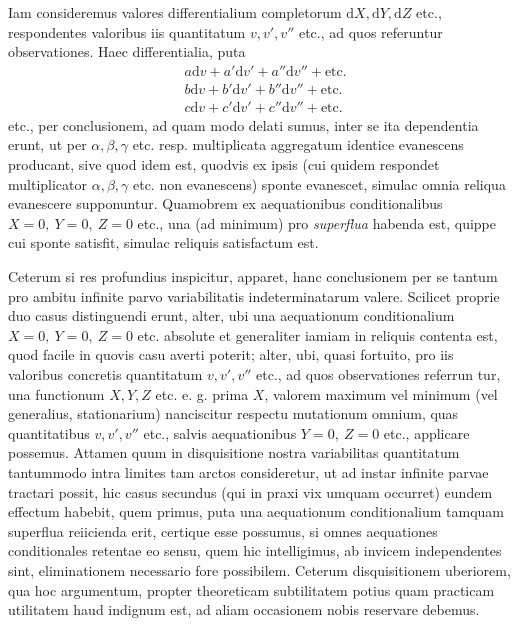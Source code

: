 Iam consideremus valores differentialium completorum \(\mathrm dX,\mathrm dY,\mathrm dZ\) etc., respondentes valoribus iis quantitatum \(v,v',v''\) etc., ad quos referuntur observationes. Haec differentialia, puta
\[
\begin{aligned}
&a\mathrm dv+a'\mathrm dv'+a''\mathrm dv''+\text{etc.}\\
&b\mathrm dv+b'\mathrm dv'+b''\mathrm dv''+\text{etc.}\\
&c\mathrm dv+c'\mathrm dv'+c''\mathrm dv''+\text{etc.}
\end{aligned}
\]
etc., per conclusionem, ad quam modo delati sumus, inter se ita dependentia erunt, ut per \(\alpha,\beta,\gamma\) etc. resp. multiplicata aggregatum identice evanescens producant, sive quod idem est, quodvis ex ipsis (cui quidem respondet multiplicator \(\alpha,\beta,\gamma\) etc. non evanescens) sponte evanescet, simulac omnia reliqua evanescere supponuntur. Quamobrem ex aequationibus conditionalibus \(X=0,\ Y=0,\ Z=0\) etc., una (ad minimum) pro \textit{superflua} habenda est, quippe cui sponte satisfit, simulac reliquis satisfactum est.

Ceterum si res profundius inspicitur, apparet, hanc conclusionem per se tantum pro ambitu infinite parvo variabilitatis indeterminatarum valere. Scilicet proprie duo casus distinguendi erunt, alter, ubi una aequationum conditionalium \(X=0,\ Y=0,\ Z=0\) etc. absolute et generaliter iamiam in reliquis contenta est, quod facile in quovis casu averti poterit; alter, ubi, quasi fortuito, pro iis valoribus concretis quantitatum \(v,v',v''\) etc., ad quos observationes referrun%
tur, una functionum \(X,Y,Z\) etc. e. g. prima \(X\), valorem maximum vel minimum (vel generalius, stationarium) nanciscitur respectu mutationum omnium, quas quantitatibus \(v,v',v''\) etc., salvis aequationibus \(Y=0,\ Z=0\) etc., applicare possemus. Attamen quum in disquisitione nostra variabilitas quantitatum tantummodo intra limites tam arctos consideretur, ut ad instar infinite parvae tractari possit, hic casus secundus (qui in praxi vix umquam occurret) eundem effectum habebit, quem primus, puta una aequationum conditionalium tamquam superflua reiicienda erit, certique esse possumus, si omnes aequationes conditionales retentae eo sensu, quem hic intelligimus, ab invicem independentes sint, eliminationem necessario fore possibilem. Ceterum disquisitionem uberiorem, qua hoc argumentum, propter theoreticam subtilitatem potius quam practicam utilitatem haud indignum est, ad aliam occasionem nobis reservare debemus.

